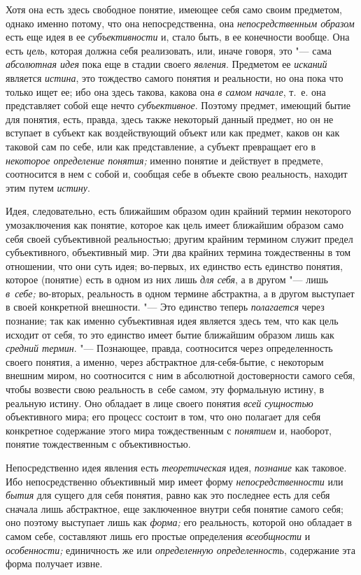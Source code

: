 Хотя она есть здесь свободное понятие, имеющее себя само своим
предметом, однако именно потому, что она непосредственна, она
{\em непосредственным образом}
есть еще идея в ее
{\em субъективности} и,
стало быть, в ее конечности вообще. Она есть
{\em цель}, которая
должна себя реализовать, или, иначе говоря, это "--- сама
{\em абсолютная идея}
пока еще в стадии своего
{\em явления}. Предметом
ее {\em исканий} является
{\em истина}, это
тождество самого понятия и реальности, но она пока что только ищет ее; ибо
она здесь такова, какова она {\em в
самом начале}, т.~е. она представляет собой еще нечто
{\em субъективное}.
Поэтому предмет, имеющий бытие для понятия, есть, правда,
здесь также некоторый данный предмет, но он не вступает в субъект как
воздействующий объект или как предмет, каков он как таковой сам по себе,
или как представление, а субъект превращает его в
{\em некоторое определение понятия;}
именно понятие и действует в предмете, соотносится в нем с собой
и, сообщая себе в объекте свою реальность, находит этим путем {\em истину}.

Идея, следовательно, есть ближайшим образом один крайний
термин некоторого умозаключения как понятие, которое как цель имеет
ближайшим образом само себя своей субъективной реальностью; другим крайним
термином служит предел субъективного, объективный мир. Эти два крайних
термина тождественны в том отношении, что они суть идея; во-первых, их
единство есть единство понятия, которое (понятие) есть в одном из них лишь
{\em для себя}, а в другом "--- лишь {\em в~себе;}
во-вторых, реальность в одном термине абстрактна, а в другом
выступает в своей конкретной внешности. "--- Это
единство теперь {\em полагается}
через познание; так как именно субъективная идея является
здесь тем, что как цель исходит от себя, то это единство имеет бытие
ближайшим образом лишь как {\em средний
термин}. "--- Познающее, правда, соотносится через
определенность своего понятия, а именно, через абстрактное
для-себя-бытие, с некоторым внешним миром, но соотносится с
ним в абсолютной достоверности самого себя, чтобы возвести свою реальность
в~себе самом, эту формальную истину, в реальную истину. Оно обладает в лице
своего понятия {\em всей сущностью}
объективного мира; его процесс состоит в том, что оно
полагает для себя конкретное содержание этого мира тождественным с
{\em понятием} и,
наоборот, понятие тождественным с объективностью.

Непосредственно идея явления есть
{\em теоретическая} идея,
{\em познание} как
таковое. Ибо непосредственно объективный мир имеет форму
{\em непосредственности}
или {\em бытия}
для сущего для себя понятия, равно как это последнее есть для
себя сначала лишь абстрактное, еще заключенное внутри себя понятие самого
себя; оно поэтому выступает лишь как {\em форма;} его
реальность, которой оно обладает в самом себе, составляют лишь его простые
определения {\em всеобщности} и {\em особенности;} единичность же или
{\em определенную определенность}, содержание эта форма получает извне.

